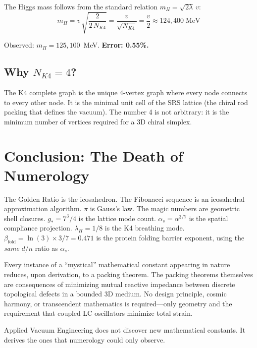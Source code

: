 The Higgs mass follows from the standard relation $m_H = \sqrt{2\lambda}\,v$:
\begin{equation}
    m_H = v\,\sqrt{\frac{2}{2\,N_{K4}}} = \frac{v}{\sqrt{N_{K4}}}
    = \frac{v}{2} \approx 124{,}400\;\text{MeV}
\end{equation}

Observed: $m_H = 125{,}100$~MeV.  \textbf{Error: 0.55\%.}

\subsection{Why $N_{K4} = 4$?}

The K4 complete graph is the unique 4-vertex graph where every
node connects to every other node.  It is the minimal unit cell
of the SRS lattice (the chiral rod packing that defines the vacuum).
The number 4 is not arbitrary: it is the minimum number of vertices
required for a 3D chiral simplex.


\section{Conclusion: The Death of Numerology}

The Golden Ratio is the icosahedron. The Fibonacci sequence is an icosahedral approximation algorithm. $\pi$ is Gauss's law. The magic numbers are geometric shell closures. $g_* = 7^3/4$ is the lattice mode count. $\alpha_s = \alpha^{3/7}$ is the spatial compliance projection. $\lambda_H = 1/8$ is the K4 breathing mode. $\beta_\text{fold} = \ln(3) \times 3/7 = 0.471$ is the protein folding barrier exponent, using the \emph{same} $d/n$ ratio as $\alpha_s$.

Every instance of a ``mystical'' mathematical constant appearing in nature reduces, upon derivation, to a packing theorem. The packing theorems themselves are consequences of minimizing mutual reactive impedance between discrete topological defects in a bounded 3D medium. No design principle, cosmic harmony, or transcendent mathematics is required---only geometry and the requirement that coupled LC oscillators minimize total strain.

Applied Vacuum Engineering does not discover new mathematical constants. It derives the ones that numerology could only observe.
